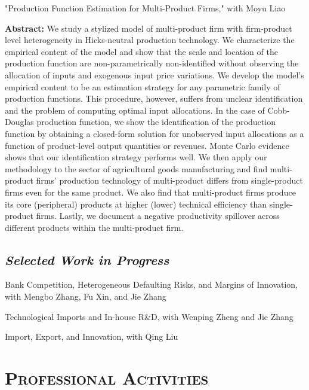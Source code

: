 \documentclass[letterpaper]{article}
\begin{document}
 \vspace{0.05in}
 "Production Function Estimation for Multi-Product Firms," with Moyu Liao
     \vspace{0.05in}
 \begin{center}
 \begin{minipage}{0.9\linewidth}
   \textbf{Abstract:} We study a stylized model of multi-product firm with firm-product level heterogeneity in Hicks-neutral production technology. We characterize the empirical content of the model and show that the scale and location of the production function are non-parametrically non-identified without observing the allocation of inputs and exogenous input price variations. We develop the model's empirical content to be an estimation strategy for any parametric family of production functions. This procedure, however, suffers from unclear identification and the problem of computing optimal input allocations. In the case of Cobb-Douglas production function, we show the identification of the production function by obtaining a closed-form solution for unobserved input allocations as a function of product-level output quantities or revenues. Monte Carlo evidence shows that our identification strategy performs well. We then apply our methodology to the sector of agricultural goods manufacturing and find multi-product firms' production technology of multi-product differs from single-product firms even for the same product. We also find that multi-product firms produce its core (peripheral) products at higher (lower) technical efficiency than single-product firms. Lastly, we document a negative productivity spillover across different products within the multi-product firm.
 \end{minipage}
 \end{center}

\subsection*{\textit{Selected Work in Progress}}
 Bank Competition, Heterogeneous Defaulting Risks, and Margins of Innovation, with Mengbo Zhang, Fu Xin, and Jie Zhang

 \vspace{0.5em}
Technological Imports and In-house R\&D, with Wenping Zheng and Jie Zhang

 \vspace{0.5em}
Import, Export, and Innovation, with Qing Liu

\section*{\textsc{Professional Activities}}
\end{document}
